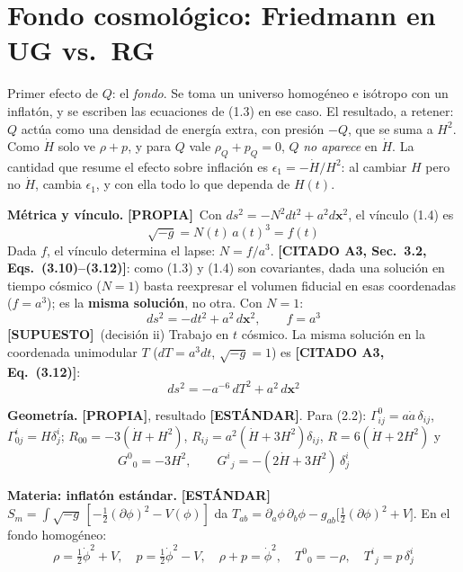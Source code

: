 \documentclass[11pt,a4paper]{article}
\newcommand{\propia}{{\bfseries\color{TealBlue}[PROPIA]}}
\newcommand{\estandar}{{\bfseries\color{BurntOrange}[ESTÁNDAR]}}
\newcommand{\supuesto}{{\bfseries\color{Plum}[SUPUESTO]}}
\newcommand{\citado}[1]{{\bfseries\color{RoyalBlue}[CITADO #1]}}
\newcommand{\sub}[2]{\par\medskip\noindent{\bfseries\color{NavyBlue}#1}\quad\textbf{#2}}
\begin{document}
\section{Fondo cosmológico: Friedmann en UG vs.\ RG}

\begin{enpalabras}
Primer efecto de $Q$: el \emph{fondo}. Se toma un universo homogéneo e isótropo con un inflatón, y se escriben las ecuaciones de (1.3) en ese caso. El resultado, a retener: $Q$ actúa como una densidad de energía extra, con presión $-Q$, que se suma a $H^2$. Como $\dot H$ solo ve $\rho+p$, y para $Q$ vale $\rho_Q+p_Q=0$, $Q$ \emph{no aparece} en $\dot H$. La cantidad que resume el efecto sobre inflación es $\epsilon_1=-\dot H/H^2$: al cambiar $H$ pero no $\dot H$, cambia $\epsilon_1$, y con ella todo lo que dependa de $H(t)$.
\end{enpalabras}

\sub{2.1}{Métrica y vínculo.} \propia\ Con $ds^2=-N^2dt^2+a^2d\mathbf x^2$, el vínculo (1.4) es
\begin{equation}
\sqrt{-g}=N(t)\,a(t)^3=f(t)\tag{2.1}
\end{equation}
Dada $f$, el vínculo determina el lapse: $N=f/a^3$. \citado{A3, Sec.~3.2, Eqs.~(3.10)--(3.12)}: como (1.3) y (1.4) son covariantes, dada una solución en tiempo cósmico ($N=1$) basta reexpresar el volumen fiducial en esas coordenadas ($f=a^3$); es la \textbf{misma solución}, no otra. Con $N=1$:
\begin{equation}
ds^2=-dt^2+a^2\,d\mathbf x^2,\qquad f=a^3\tag{2.2}
\end{equation}
\supuesto\ (decisión ii) Trabajo en $t$ cósmico. La misma solución en la coordenada unimodular $T$ ($dT=a^3dt$, $\sqrt{-g}=1$) es \citado{A3, Eq.~(3.12)}:
\begin{equation}
ds^2=-a^{-6}\,dT^2+a^2\,d\mathbf x^2\tag{2.3}
\end{equation}

\sub{2.2}{Geometría.} \propia, resultado \estandar. Para (2.2): $\Gamma^0_{ij}=a\dot a\,\delta_{ij}$, $\Gamma^i_{0j}=H\delta^i_j$; $R_{00}=-3(\dot H+H^2)$, $R_{ij}=a^2(\dot H+3H^2)\delta_{ij}$, $R=6(\dot H+2H^2)$ y
\begin{equation}
G^0{}_0=-3H^2,\qquad G^i{}_j=-(2\dot H+3H^2)\,\delta^i_j\tag{2.4}
\end{equation}

\sub{2.3}{Materia: inflatón estándar.} \estandar\ $S_m=\int\sqrt{-g}\,[-\tfrac12(\partial\phi)^2-V(\phi)]$ da $T_{ab}=\partial_a\phi\,\partial_b\phi-g_{ab}\big[\tfrac12(\partial\phi)^2+V\big]$. En el fondo homogéneo:
\begin{equation}
\rho=\tfrac12\dot\phi^2+V,\quad p=\tfrac12\dot\phi^2-V,\quad\rho+p=\dot\phi^2,\quad T^0{}_0=-\rho,\quad T^i{}_j=p\,\delta^i_j\tag{2.5}
\end{equation}
\end{document}
